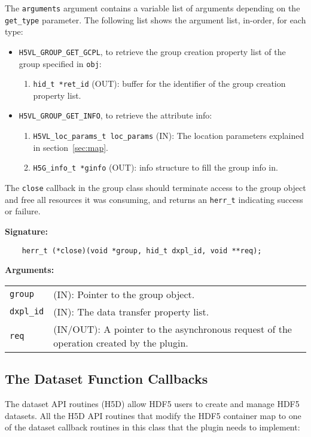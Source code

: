 The {\tt arguments} argument contains a variable list of arguments
depending on the {\tt get\_type} parameter. The following list shows
the argument list, in-order, for each type:

\begin{itemize}
\item {\tt H5VL\_GROUP\_GET\_GCPL}, to retrieve the group creation
  property list of the group specified in {\tt obj}:
  \begin{enumerate}
  \item {\tt hid\_t *ret\_id} (OUT): buffer for the identifier of the
    group creation property list.
  \end{enumerate}

\item {\tt H5VL\_GROUP\_GET\_INFO}, to retrieve the attribute info:
  \begin{enumerate}
  \item {\tt H5VL\_loc\_params\_t loc\_params} (IN): The location parameters
    explained in section~\ref{sec:map}. 
  \item {\tt H5G\_info\_t *ginfo} (OUT): info structure to fill the
    group info in.
  \end{enumerate}
\end{itemize}

The {\tt close} callback in the group class should terminate access to
the group object and free all resources it was consuming, and returns
an {\tt herr\_t} indicating success or failure.

\textbf{Signature:}
\begin{lstlisting}
    herr_t (*close)(void *group, hid_t dxpl_id, void **req);
\end{lstlisting}

\textbf{Arguments:}\\
\begin{tabular}{l p{10cm}}
  {\tt group} & (IN): Pointer to the group object.\\
  {\tt dxpl\_id} & (IN): The data transfer property list.\\
  {\tt req} & (IN/OUT): A pointer to the asynchronous request of the
  operation created by the plugin.\\
\end{tabular}

\subsection{The Dataset Function Callbacks}
The dataset API routines (H5D) allow HDF5 users to create and manage
HDF5 datasets. All the H5D API routines that modify the HDF5 container
map to one of the dataset callback routines in this class that the
plugin needs to implement:

